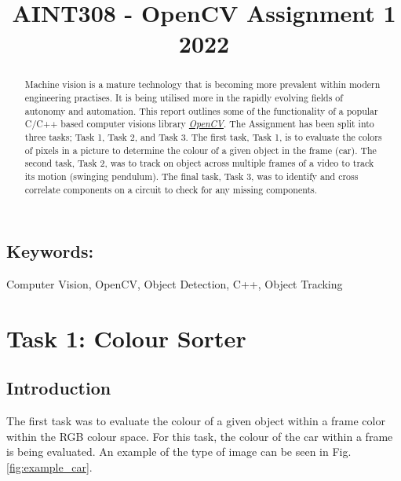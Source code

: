\documentclass[conference]{IEEEtran}
\begin{document}
\title{AINT308 - OpenCV Assignment 1 2022}

\author{
}

\maketitle

\begin{abstract}

Machine vision is a mature technology that is becoming more prevalent within modern engineering practises. It is being utilised more in the rapidly evolving fields of autonomy and automation. This report outlines some of the functionality of a popular C/C++ based computer visions library \href{https://opencv.org}{\textit{OpenCV}}. The Assignment has been split into three tasks; Task 1, Task 2, and Task 3. The first task, Task 1, is to evaluate the colors of pixels in a picture to determine the colour of a given object in the frame (car). The second task, Task 2, was to track on object across multiple frames of a video to track its motion (swinging pendulum). The final task, Task 3, was to identify and cross correlate components on a circuit to check for any missing components.

\end{abstract}

\subsection*{Keywords:} 
Computer Vision, OpenCV, Object Detection, C++, Object Tracking

\section{Task 1: Colour Sorter}	
\subsection{Introduction}
The first task was to evaluate the colour of a given object within a frame color within the RGB colour space. For this task, the colour of the car within a frame is being evaluated. An example of the type of image can be seen in Fig. \ref{fig:example_car}.
\end{document}
